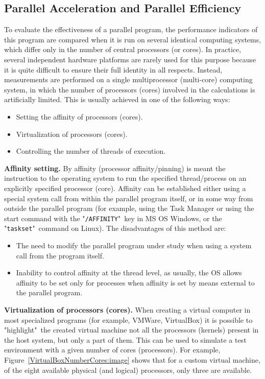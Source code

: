 { %
	\subsection{Parallel Acceleration and Parallel Efficiency}
	\par To evaluate the effectiveness of a parallel program, the performance indicators of this program are compared when it is run on several identical computing systems, which differ only in the number of central processors (or cores). In practice, several independent hardware platforms are rarely used for this purpose because it is quite difficult to ensure their full identity in all respects. Instead, measurements are performed on a single multiprocessor (multi-core) computing system, in which the number of processors (cores) involved in the calculations is artificially limited. This is usually achieved in one of the following ways:
	\begin{itemize}
		\item Setting the affinity of processors (cores).
		\item Virtualization of processors (cores).
		\item Controlling the number of threads of execution.
	\end{itemize}
	\textbf{Affinity setting.} By affinity (processor affinity/pinning) is meant the instruction to the operating system to run the specified thread/process on an explicitly specified processor (core). Affinity can be established either using a special system call from within the parallel program itself, or in some way from outside the parallel program (for example, using the Task Manager or using the start command with the "\texttt{/AFFINITY}"\ key in MS OS Windows, or the "\texttt{taskset}"\ command on Linux). The disadvantages of this method are:
	\begin{itemize}
		\item The need to modify the parallel program under study when using a system call from the program itself.
		\item Inability to control affinity at the thread level, as usually, the OS allows affinity to be set only for processes when affinity is set by means external to the parallel program.
	\end{itemize}
	\textbf{Virtualization of processors (cores).} When creating a virtual computer in most specialized programs (for example, VMWare, VirtualBox) it is possible to "highlight"\ the created virtual machine not all the processors (kernels) present in the host system, but only a part of them. This can be used to simulate a test environment with a given number of cores (processors). For example,  Figure~\ref{VirtualBoxNumberCores:image} shows that for a custom virtual machine, of the eight available physical (and logical) processors, only three are available.
}
